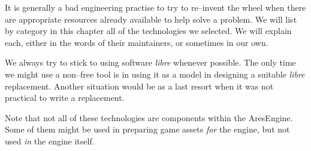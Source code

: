 

It is generally a bad engineering practise to try to re--invent the wheel when there are appropriate resources already available to help solve a problem. We will list by category in this chapter all of the technologies we selected. We will explain each, either in the words of their maintainers, or sometimes in our own.

We always try to stick to using software {\it libre} whenever possible. The only time we might use a non--free tool is in using it as a model in designing a suitable {\it libre} replacement. Another situation would be as a last resort when it was not practical to write a replacement.

Note that not all of these technologies are components within the AresEngine. Some of them might be used in preparing  game assets {\it for} the engine, but not used {\it in} the engine itself.













\StopChapter

